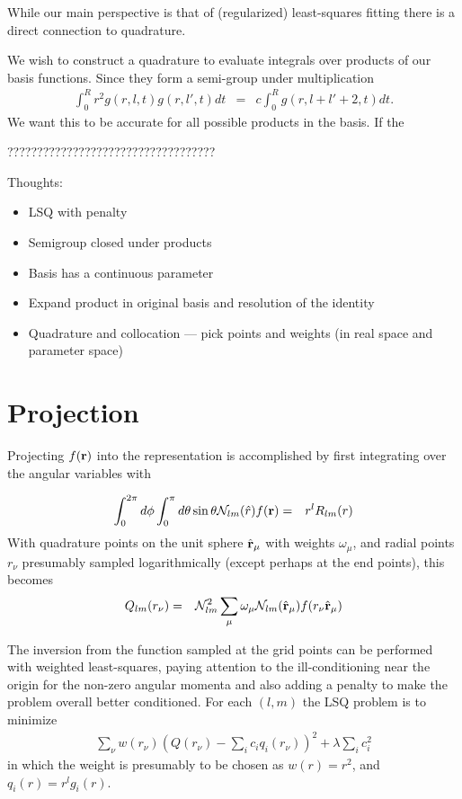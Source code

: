 \documentclass[12pt]{article}
\newcommand{\N}{\mathcal{N}}
\begin{document}
While our main perspective is that of (regularized) least-squares fitting there is a direct connection to quadrature.

We wish to construct a quadrature to evaluate integrals over products of our basis functions.  Since they form a semi-group under multiplication
\begin{eqnarray}
  \int_0^R r^2 g(r,l,t) g(r,l',t) dt & = & c \int_0^R g(r,l+l\prime +2,t) dt .
\end{eqnarray}
We want this to be accurate for all possible products in the basis.  If the

???????????????????????????????????

Thoughts:
\begin{itemize}
\item LSQ with penalty
\item Semigroup closed under products
\item Basis has a continuous parameter
\item Expand product in original basis and resolution of the identity
\item Quadrature and collocation --- pick points and weights (in real space and parameter space)
\end{itemize}



\section{Projection}

Projecting $f(\vb{r})$ into the representation is accomplished by first integrating over the angular variables with

\begin{eqnarray}
  \int_0^{2 \pi} d\phi \int_0^\pi d\theta \sin \theta  \N_{lm} (\hat{r}) f(\vb{r}) & = & r^l R_{lm}(r) 
\end{eqnarray}
With quadrature points on the unit sphere $\hat{\vb{r}}_\mu$ with
weights $\omega_\mu$, and radial points $r_\nu$ presumably sampled
logarithmically (except perhaps at the end points), this becomes
\begin{eqnarray}
  Q_{lm}(r_\nu) & = & \mathcal{\N}_{lm}^2 \sum_\mu \omega_\mu \N_{lm} (\hat{\vb{r}}_\mu) f(r_\nu \hat{\vb{r}}_\mu)
\end{eqnarray}

The inversion from the function sampled at the grid points can be performed with weighted least-squares, paying attention to the ill-conditioning near the origin for the non-zero angular momenta and also adding a penalty to make the problem overall better conditioned.  For each $(l,m)$ the LSQ problem is to minimize
\begin{eqnarray}
  \sum_\nu  w(r_\nu) \left( Q(r_\nu) - \sum_i c_i q_i(r_\nu) \right)^2 + \lambda \sum_i c_i^2
\end{eqnarray}
in which the weight is presumably to be chosen as $w(r)=r^2$, and $q_i(r) = r^l g_i(r)$.
\end{document}
